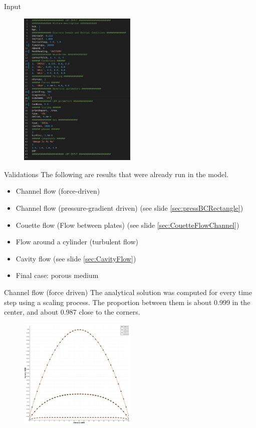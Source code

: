 \documentclass{beamer}
\begin{document}
	\begin{frame}{Input}
		\begin{figure}
			\centering
			\includegraphics[width=0.5\textwidth]{pics/modelInput.png}
		\end{figure}
	\end{frame}

	\begin{frame}{Validations}
		The following are results that were already run in the model.
		\begin{itemize}
			\item Channel flow (force-driven)
			\item Channel flow (pressure-gradient driven) (see slide \ref{sec:pressBCRectangle})
			\item Couette flow (Flow between plates) (see slide 	\ref{sec:CouetteFlowChannel})
			\item Flow around a cylinder (turbulent flow)
			\item Cavity flow (see slide \ref{sec:CavityFlow})
			\item Final case: porous medium
		\end{itemize}
	\end{frame}
	
	\begin{frame}{Channel flow (force driven)}
		The analytical solution was computed for every time step using a scaling process. The proportion between them is about 0.999 in the center, and about 0.987 close to the corners.
		\begin{figure}
			\centering
			\includegraphics[width=0.5\textwidth]{pics/channelForceDrivenValidation.png}
		\end{figure}
	\end{frame}
\end{document}
